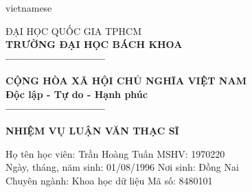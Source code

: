 \begin{titlepage}
\begin{otherlanguage*}{vietnamese}

    \begin{minipage}[t]{0.42\textwidth}
        \begin{center}
            \fontsize{11.5}{11.5}ĐẠI HỌC QUỐC GIA TPHCM\\
            \textbf{TRƯỜNG ĐẠI HỌC BÁCH KHOA}\\
            \textbf{---------------------------}\\
        \end{center}
    \end{minipage}
    \noindent
    \begin{minipage}[t]{0.57\textwidth}
        \begin{center}
            \fontsize{11.5}{11.5}\textbf{CỘNG HÒA XÃ HỘI CHỦ NGHĨA VIỆT NAM}\\
            \textbf{Độc lập - Tự do - Hạnh phúc}\\
            \textbf{---------------------------}\\
        \end{center}
    \end{minipage}

    \begin{center}
        \fontsize{18}{18}\textbf{NHIỆM VỤ LUẬN VĂN THẠC SĨ}
    \end{center}

    \begin{flushleft}
        Họ tên học viên: Trần Hoàng Tuấn
        \tabto{10cm}
        MSHV: 1970220\\
        Ngày, tháng, năm sinh: 01/08/1996
        \tabto{10cm}
        Nơi sinh: Đồng Nai\\
        Chuyên ngành: Khoa học dữ liệu
        \tabto{10cm}
        Mã số: 8480101\\


\end{flushleft}
\end{otherlanguage*}
\end{titlepage}
